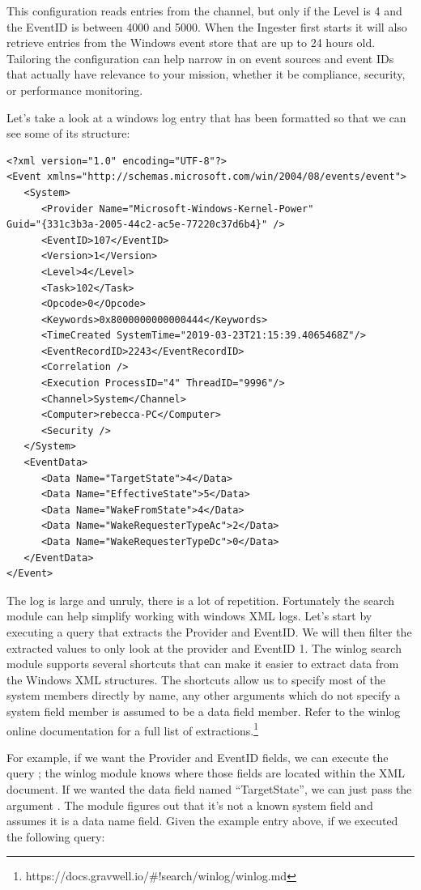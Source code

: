 This configuration reads entries from the
 channel, but only if the Level
is 4 and the EventID is between 4000 and 5000. When the Ingester first
starts it will also retrieve entries from the Windows event store that
are up to 24 hours old. Tailoring the configuration can help narrow in
on event sources and event IDs that actually have relevance to your
mission, whether it be compliance, security, or performance monitoring.

Let's take a look at a windows log entry that has been formatted so
that we can see some of its structure:

\begin{Verbatim}[breaklines=true]
<?xml version="1.0" encoding="UTF-8"?>
<Event xmlns="http://schemas.microsoft.com/win/2004/08/events/event">
   <System>
      <Provider Name="Microsoft-Windows-Kernel-Power"
Guid="{331c3b3a-2005-44c2-ac5e-77220c37d6b4}" />
      <EventID>107</EventID>
      <Version>1</Version>
      <Level>4</Level>
      <Task>102</Task>
      <Opcode>0</Opcode>
      <Keywords>0x8000000000000444</Keywords>
      <TimeCreated SystemTime="2019-03-23T21:15:39.4065468Z"/>
      <EventRecordID>2243</EventRecordID>
      <Correlation />
      <Execution ProcessID="4" ThreadID="9996"/>
      <Channel>System</Channel>
      <Computer>rebecca-PC</Computer>
      <Security />
   </System>
   <EventData>
      <Data Name="TargetState">4</Data>
      <Data Name="EffectiveState">5</Data>
      <Data Name="WakeFromState">4</Data>
      <Data Name="WakeRequesterTypeAc">2</Data>
      <Data Name="WakeRequesterTypeDc">0</Data>
   </EventData>
</Event>
\end{Verbatim}

The log is large and unruly, there is a lot of repetition. Fortunately
the  search module can help simplify working with windows XML
logs. Let's start by executing a query that extracts the Provider and
EventID. We will then filter the extracted values to only look at the
 provider and EventID 1. The winlog
search module supports several shortcuts that can make it easier to
extract data from the Windows XML structures. The shortcuts allow us to
specify most of the system members directly by name, any other arguments
which do not specify a system field member is assumed to be a data field
member. Refer to the winlog online documentation for a full list of extractions.\footnote{https://docs.gravwell.io/\#!search/winlog/winlog.md}

For example, if we want the Provider and EventID fields, we can
execute the query ; the winlog module knows
where those fields are located within the XML document. If we wanted the data field named
``TargetState'', we can just pass the argument . The
 module figures out that it's not a known system field and
assumes it is a data name field. Given the example entry above, if we
executed the following query:


